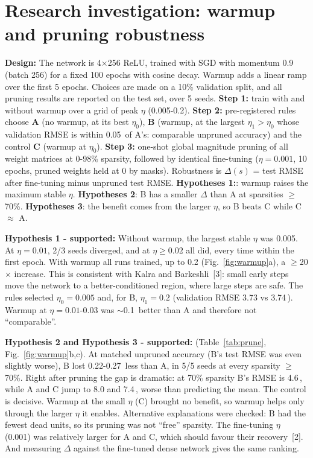 \documentclass[10pt,a4paper]{article}
\newcommand{\A}{\,\text{\AA}}
\begin{document}
\section{Research investigation: warmup and pruning robustness}
\textbf{Design:} The network is 4$\times$256 ReLU, trained with SGD with momentum 0.9 (batch 256) for a fixed 100 epochs with cosine decay. Warmup
adds a linear ramp over the first 5 epochs. Choices are made on a 10\% validation split, and all pruning results are reported on the
test set, over 5 seeds. \textbf{Step 1:} train with and without warmup over a grid of peak $\eta$
(0.005-0.2). \textbf{Step 2:} pre-registered rules choose \textbf{A} (no warmup, at its best $\eta_0$),
\textbf{B} (warmup, at the largest $\eta_1>\eta_0$ whose validation RMSE is within 0.05\A{} of A's: comparable
unpruned accuracy) and the control \textbf{C} (warmup at $\eta_0$). \textbf{Step 3:} one-shot global
magnitude pruning of all weight matrices at 0-98\% sparsity, followed by identical fine-tuning ($\eta=0.001$, 10 epochs,
pruned weights held at 0 by masks). Robustness is $\Delta(s)$ = test RMSE after fine-tuning minus unpruned test RMSE.
\textbf{Hypotheses 1:}: warmup raises the maximum stable $\eta$. \textbf{Hypotheses 2}: B has a smaller $\Delta$ than A at
sparsities $\geq$70\%. \textbf{Hypotheses 3}: the benefit comes from the larger $\eta$, so B beats C while C $\approx$ A.

\textbf{Hypothesis 1 - supported:} Without warmup, the largest stable $\eta$ was 0.005. At $\eta=0.01$, 2/3 seeds diverged, and at
$\eta\geq0.02$ all did, every time within the first epoch. With warmup all runs trained, up to 0.2
(Fig.~\ref{fig:warmup}a), a $\geq$20$\times$ increase. This is consistent with Kalra and Barkeshli~[3]: small early steps move the
network to a better-conditioned region, where large steps are safe. The rules selected $\eta_0=0.005$ and, for B,
$\eta_1=0.2$ (validation RMSE 3.73 vs 3.74\A). Warmup at $\eta=0.01$-0.03 was $\sim$0.1\A{} better than A and therefore not
``comparable''.

\textbf{Hypothesis 2 and Hypothesis 3 - supported:} (Table~\ref{tab:prune}, Fig.~\ref{fig:warmup}b,c). At matched unpruned accuracy
(B's test RMSE was even slightly worse), B lost 0.22-0.27\A{} less than A, in 5/5 seeds at every sparsity $\geq$70\%.
Right after pruning the gap is dramatic: at 70\% sparsity B's RMSE is 4.6\A, while A and C jump to 8.0 and 7.4\A,
worse than predicting the mean. The control is decisive. Warmup at the small $\eta$ (C) brought no benefit,
so warmup helps only through the larger $\eta$ it enables. Alternative explanations were checked:
B had the fewest dead units, so its pruning was not ``free'' sparsity. The fine-tuning $\eta$ (0.001) was
relatively larger for A and C, which should favour their recovery~[2]. And measuring $\Delta$ against the fine-tuned
dense network gives the same ranking.
\end{document}
